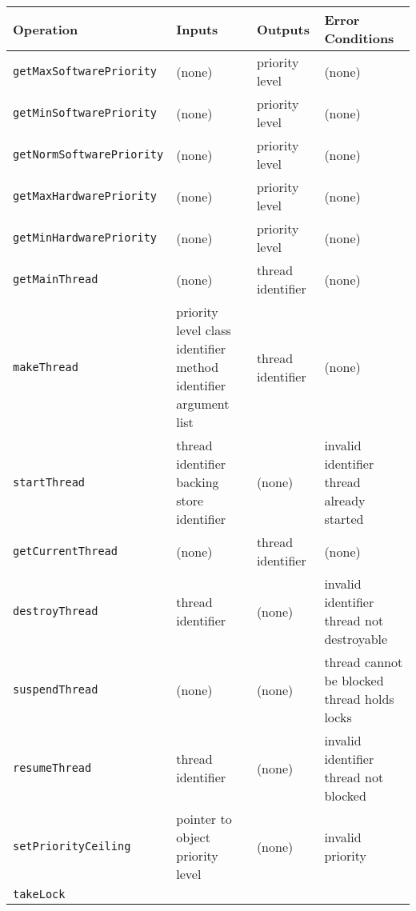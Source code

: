 \begin{table*}[ht]
  \centering
  \footnotesize
  \begin{tabular}{|l|p{3.2cm}|p{2.3cm}|p{3.6cm}|}
    Operation & Inputs & Outputs & Error Conditions \\
    \hline
    \texttt{getMaxSoftwarePriority} &
    (none) &
    priority level &
    (none)
    \\\texttt{getMinSoftwarePriority} &
    (none) &
    priority level &
    (none)
    \\\texttt{getNormSoftwarePriority} &
    (none) &
    priority level &
    (none)
    \\\texttt{getMaxHardwarePriority} &
    (none) &
    priority level &
    (none)
    \\\texttt{getMinHardwarePriority} &
    (none) &
    priority level &
    (none)
    \\\texttt{getMainThread} &
    (none) &
    thread identifier &
    (none)
    \\\texttt{makeThread} &
    priority level \newline
    class identifier \newline
    method identifier \newline 
    argument list &
    thread identifier &
    (none)
    \\\texttt{startThread} &
    thread identifier \newline
    backing store identifier &
    (none) &
    invalid identifier \newline
    thread already started
    \\\texttt{getCurrentThread} &
    (none) &
    thread identifier &
    (none)
    \\\texttt{destroyThread} &
    thread identifier &
    (none) &
    invalid identifier \newline
    thread not destroyable
    \\\texttt{suspendThread} &
    (none) &
    (none) &
    thread cannot be blocked \newline
    thread holds locks
    \\\texttt{resumeThread} &
    thread identifier &
    (none) &
    invalid identifier \newline
    thread not blocked
    \\\texttt{setPriorityCeiling} &
    pointer to object \newline
    priority level &
    (none) &
    invalid priority
    \\\texttt{takeLock} &

\end{tabular}
\end{table*}

